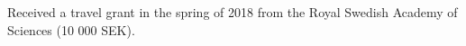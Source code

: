 

\begin{cvparagraph}

Received a travel grant in the spring of 2018 from the Royal Swedish Academy of Sciences (10 000 SEK).
\end{cvparagraph}